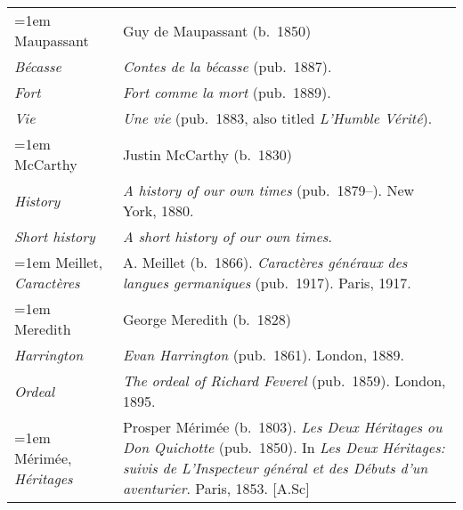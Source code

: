 \begin{xltabular}{\textwidth}{ lQ }
\hangindent=1em  Maupassant & Guy de Maupassant (b.~1850) \\
\hspace{1em}\textit{Bécasse} & \textit{Contes de la bécasse} (pub.~1887). \\
\hspace{1em}\textit{Fort} & \textit{Fort comme la mort} (pub.~1889). \\
\hspace{1em}\textit{Vie} & \textit{Une vie} (pub.~1883, also titled \textit{L'Humble Vérité}). \\

\hangindent=1em  McCarthy & Justin McCarthy (b.~1830) \\
\hspace{1em}\textit{History} & \textit{A history of our own times} (pub.~1879--). New York, 1880. \\ %
\hspace{1em}\textit{Short history} & \textit{A short history of our own times}. \\ %

\hangindent=1em  Meillet, \textit{Caractères} & A. Meillet (b.~1866). \textit{Caractères généraux des langues germaniques} (pub.~1917). Paris, 1917. \\ 

\hangindent=1em  Meredith & George Meredith (b.~1828) \\
\hspace{1em}\textit{Harrington} & \textit{Evan Harrington} (pub.~1861). London, 1889. \\
\hspace{1em}\textit{Ordeal} & \textit{The ordeal of Richard Feverel} (pub.~1859). London, 1895. \\

\hangindent=1em  Mérimée, \textit{Héritages} & Prosper Mérimée (b.~1803). \textit{Les Deux Héritages ou Don Quichotte} (pub.~1850). In \textit{Les Deux Héritages: suivis de L'Inspecteur général et des Débuts d'un aventurier}. Paris, 1853. [A.Sc] \\


\end{xltabular}
